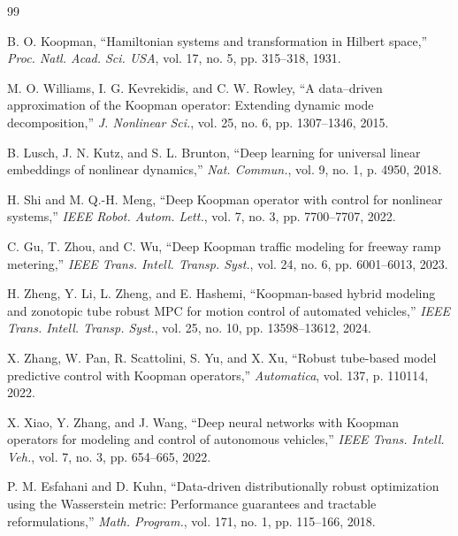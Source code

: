 \documentclass[pdflatex,sn-mathphys,Numbered]{sn-jnl}
\numberwithin{equation}{section}
\begin{document}
	\begin{thebibliography}{99}
		
		B. O. Koopman, ``Hamiltonian systems and transformation in Hilbert space,''
		\textit{Proc. Natl. Acad. Sci. USA}, vol. 17, no. 5, pp. 315--318, 1931.
		
		M. O. Williams, I. G. Kevrekidis, and C. W. Rowley,
		``A data–driven approximation of the Koopman operator: Extending dynamic mode decomposition,''
		\textit{J. Nonlinear Sci.}, vol. 25, no. 6, pp. 1307--1346, 2015.
		
		B. Lusch, J. N. Kutz, and S. L. Brunton,
		``Deep learning for universal linear embeddings of nonlinear dynamics,''
		\textit{Nat. Commun.}, vol. 9, no. 1, p. 4950, 2018.
		
		H. Shi and M. Q.-H. Meng,
		``Deep Koopman operator with control for nonlinear systems,''
		\textit{IEEE Robot. Autom. Lett.}, vol. 7, no. 3, pp. 7700--7707, 2022.
		
		C. Gu, T. Zhou, and C. Wu,
		``Deep Koopman traffic modeling for freeway ramp metering,''
		\textit{IEEE Trans. Intell. Transp. Syst.}, vol. 24, no. 6, pp. 6001--6013, 2023.
		
		H. Zheng, Y. Li, L. Zheng, and E. Hashemi,
		``Koopman-based hybrid modeling and zonotopic tube robust MPC for motion control of automated vehicles,''
		\textit{IEEE Trans. Intell. Transp. Syst.}, vol. 25, no. 10, pp. 13598--13612, 2024.
		
		X. Zhang, W. Pan, R. Scattolini, S. Yu, and X. Xu,
		``Robust tube-based model predictive control with Koopman operators,''
		\textit{Automatica}, vol. 137, p. 110114, 2022.
		
		X. Xiao, Y. Zhang, and J. Wang,
		``Deep neural networks with Koopman operators for modeling and control of autonomous vehicles,''
		\textit{IEEE Trans. Intell. Veh.}, vol. 7, no. 3, pp. 654--665, 2022.
		
		P. M. Esfahani and D. Kuhn,
		``Data-driven distributionally robust optimization using the Wasserstein metric: Performance guarantees and tractable reformulations,''
		\textit{Math. Program.}, vol. 171, no. 1, pp. 115--166, 2018.
		

\end{thebibliography}
\end{document}
